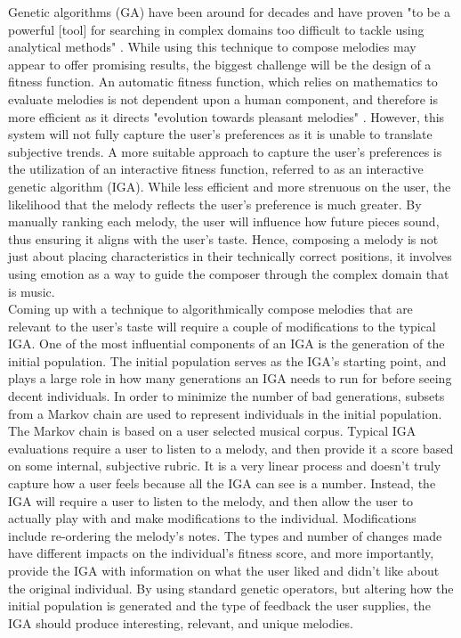 \documentclass[12pt]{article} %
\begin{document}
Genetic algorithms (GA) have been around for decades and have proven "to be a powerful [tool] for searching in complex domains too difficult to tackle using analytical methods" \cite{Jensen}. While using this technique to compose melodies may appear to offer promising results, the biggest challenge will be the design of a fitness function. An automatic fitness function, which relies on mathematics to evaluate melodies is not dependent upon a human component, and therefore is more efficient as it directs "evolution towards pleasant melodies" \cite{Jensen}. However, this system will not fully capture the user's preferences as it is unable to translate subjective trends. A more suitable approach to capture the user's preferences is the utilization of an interactive fitness function, referred to as an interactive genetic algorithm (IGA). While less efficient and more strenuous on the user, the likelihood that the melody reflects the user's preference is much greater. By manually ranking each melody, the user will influence how future pieces sound, thus ensuring it aligns with the user's taste. Hence, composing a melody is not just about placing characteristics in their technically correct positions, it involves using emotion as a way to guide the composer through the complex domain that is music. \\

Coming up with a technique to algorithmically compose melodies that are relevant to the user's taste will require a couple of modifications to the typical IGA. One of the most influential components of an IGA is the generation of the initial population. The initial population serves as the IGA's starting point, and plays a large role in how many generations an IGA needs to run for before seeing decent individuals. In order to minimize the number of bad generations, subsets from a Markov chain are used to represent individuals in the initial population. The Markov chain is based on a user selected musical corpus. Typical IGA evaluations require a user to listen to a melody, and then provide it a score based on some internal, subjective rubric. It is a very linear process and doesn't truly capture how a user feels because all the IGA can see is a number. Instead, the IGA will require a user to listen to the melody, and then allow the user to actually play with and make modifications to the individual. Modifications include re-ordering the melody's notes. The types and number of changes made have different impacts on the individual's fitness score, and more importantly, provide the IGA with information on what the user liked and didn't like about the original individual. By using standard genetic operators, but altering how the initial population is generated and the type of feedback the user supplies, the  IGA should produce interesting, relevant, and unique melodies. \\
\end{document}
